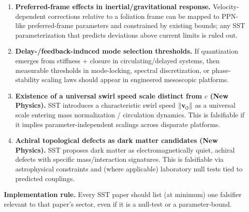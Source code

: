 \documentclass[11pt]{article}
\begin{document}
            \begin{enumerate}
                \item \textbf{Preferred-frame effects in inertial/gravitational response.}
                Velocity-dependent corrections relative to a foliation frame can be mapped to PPN-like preferred-frame parameters and constrained by existing bounds; any SST parameterization that predicts deviations above current limits is ruled out.

                \item \textbf{Delay-/feedback-induced mode selection thresholds.}
                If quantization emerges from stiffness + closure in circulating/delayed systems, then measurable thresholds in mode-locking, spectral discretization, or phase-stability scaling laws should appear in engineered mesoscopic platforms.

                \item \textbf{Existence of a universal swirl speed scale distinct from \(c\) \textbf{(New Physics)}.}
                SST introduces a characteristic swirl speed \(\lVert \vswirl \rVert\) as a universal scale entering mass normalization / circulation dynamics. This is falsifiable if it implies parameter-independent scalings across disparate platforms.

                \item \textbf{Achiral topological defects as dark matter candidates \textbf{(New Physics)}.}
                SST proposes dark matter as electromagnetically quiet, achiral defects with specific mass/interaction signatures. This is falsifiable via astrophysical constraints and (where applicable) laboratory null tests tied to predicted couplings.
            \end{enumerate}

            \noindent\textbf{Implementation rule.}
            Every SST paper should list (at minimum) one falsifier relevant to that paper’s sector, even if it is a null-test or a parameter-bound.

\end{document}
